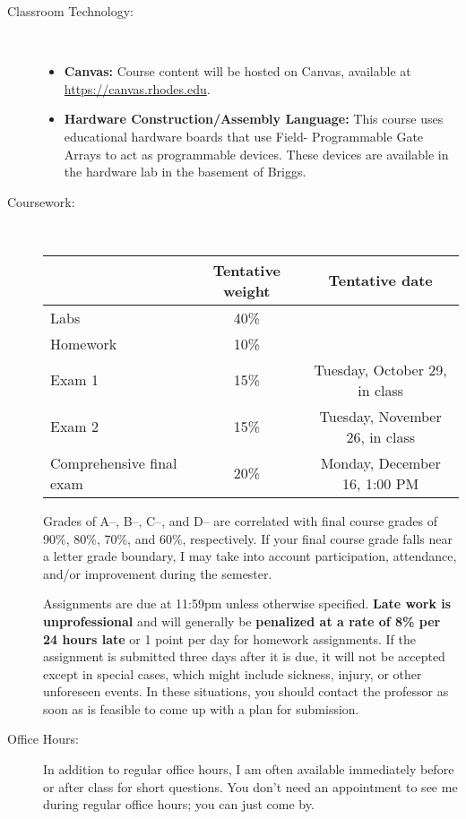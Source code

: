 \documentclass [letterpaper,11pt]{article}
\begin{document}
\begin{description}
\item[Classroom Technology:]\
\begin{itemize}
\item \textbf{Canvas:} Course content will be hosted on Canvas, available at \url{https://canvas.rhodes.edu}.

\item \textbf{Hardware Construction/Assembly Language:} This course uses educational hardware boards that use Field-
Programmable Gate Arrays to act as programmable devices. These devices are available in the hardware lab
in the basement of Briggs.
\end{itemize}

\newpage\item[Coursework:] \

\begin{tabular}{lcc} 
& Tentative weight & Tentative date \\ \hline
Labs & 40\% & \\
Homework & 10\% & \\
Exam 1 & 15\% & Tuesday, October 29, in class \\
Exam 2 & 15\% & Tuesday, November 26, in class\\
Comprehensive final exam & 20\% & Monday, December 16, 1:00 PM\\
\end{tabular}

Grades of A--, B--, C--, and D-- are correlated with final course grades of 90\%, 80\%,
70\%, and 60\%, respectively.  If your final course grade falls near a letter grade boundary,
I may take into account participation, attendance, and/or improvement during the semester.

Assignments are due at 11:59pm unless otherwise specified.  \textbf{Late work is unprofessional} and will generally be \textbf{penalized at a rate of 8\% per 24 hours late} or 1 point per day for homework assignments.  If the assignment is submitted three days after it is due, it will not be accepted except in special cases, which might include sickness, injury, or other unforeseen events. In these situations, you should contact the professor as soon as is feasible to come up with a plan for submission.

\item[Office Hours:]
In addition to regular office hours, I am often available immediately before or after class for 
short questions.  You don't need an appointment to see me during regular office hours; you
can just come by.  


\end{description}
\end{document}
